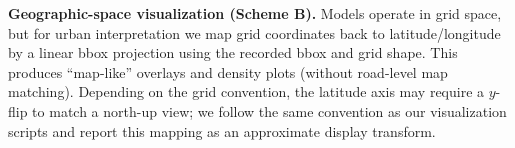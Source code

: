 \textbf{Geographic-space visualization (Scheme B).}
Models operate in grid space, but for urban interpretation we map grid coordinates back to latitude/longitude by a linear bbox projection using the recorded bbox and grid shape. This produces ``map-like'' overlays and density plots (without road-level map matching). Depending on the grid convention, the latitude axis may require a $y$-flip to match a north-up view; we follow the same convention as our visualization scripts and report this mapping as an approximate display transform.
